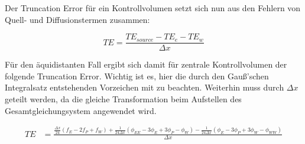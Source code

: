Der Truncation Error für ein Kontrollvolumen setzt sich nun aus den Fehlern von Quell-
und Diffusionstermen zusammen:

\begin{equation*}
  TE = \frac{TE_{source} - TE_e - TE_w}{\Delta x}
\end{equation*}

Für den äquidistanten Fall ergibt sich damit für zentrale Kontrollvolumen der folgende
Truncation Error. Wichtig ist es, hier die durch den Gauß'schen Integralsatz 
entstehenden Vorzeichen mit zu beachten. Weiterhin muss durch $\Delta x$ geteilt werden,
da die gleiche Transformation beim Aufstellen des Gesamtgleichungsystem angewendet wird.

\begin{align}
  TE &= \frac{\frac{\Delta x}{24} \left({f_E-2f_P+f_W}\right)
   +\frac{1}{24\Delta x}\left({
\phi_{EE}-3\phi_E+3\phi_P-\phi_W}\right)
  -\frac{1}{24 \Delta x}\left({
\phi_E-3\phi_P+3\phi_W-\phi_{WW}}\right)}{\Delta x}
\end{align}
